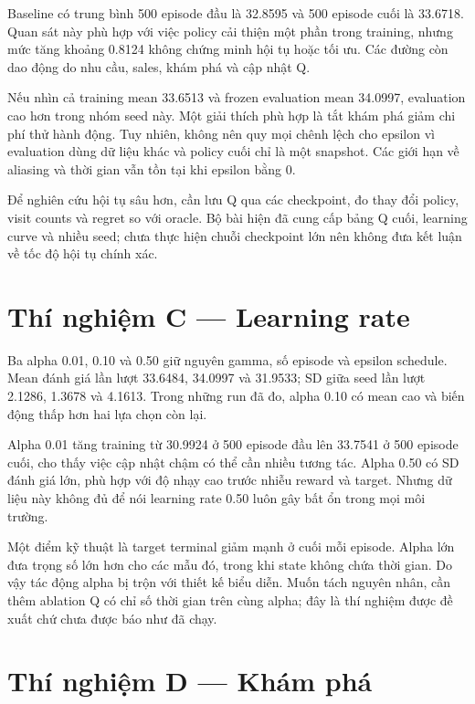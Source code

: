 Baseline có trung bình 500 episode đầu là 32.8595 và 500 episode cuối là
33.6718. Quan sát này phù hợp với việc policy cải thiện một phần trong
training, nhưng mức tăng khoảng 0.8124 không chứng minh hội tụ hoặc tối
ưu. Các đường còn dao động do nhu cầu, sales, khám phá và cập nhật Q.

Nếu nhìn cả training mean 33.6513 và frozen evaluation mean 34.0997,
evaluation cao hơn trong nhóm seed này. Một giải thích phù hợp là tắt
khám phá giảm chi phí thử hành động. Tuy nhiên, không nên quy mọi chênh
lệch cho epsilon vì evaluation dùng dữ liệu khác và policy cuối chỉ là
một snapshot. Các giới hạn về aliasing và thời gian vẫn tồn tại khi
epsilon bằng 0.

Để nghiên cứu hội tụ sâu hơn, cần lưu Q qua các checkpoint, đo thay đổi
policy, visit counts và regret so với oracle. Bộ bài hiện đã cung cấp
bảng Q cuối, learning curve và nhiều seed; chưa thực hiện chuỗi
checkpoint lớn nên không đưa kết luận về tốc độ hội tụ chính xác.

\section{Thí nghiệm C --- Learning
rate}\label{thuxed-nghiux1ec7m-c-learning-rate}

Ba alpha 0.01, 0.10 và 0.50 giữ nguyên gamma, số episode và epsilon
schedule. Mean đánh giá lần lượt 33.6484, 34.0997 và 31.9533; SD giữa
seed lần lượt 2.1286, 1.3678 và 4.1613. Trong những run đã đo, alpha
0.10 có mean cao và biến động thấp hơn hai lựa chọn còn lại.

Alpha 0.01 tăng training từ 30.9924 ở 500 episode đầu lên 33.7541 ở 500
episode cuối, cho thấy việc cập nhật chậm có thể cần nhiều tương tác.
Alpha 0.50 có SD đánh giá lớn, phù hợp với độ nhạy cao trước nhiễu
reward và target. Nhưng dữ liệu này không đủ để nói learning rate 0.50
luôn gây bất ổn trong mọi môi trường.

Một điểm kỹ thuật là target terminal giảm mạnh ở cuối mỗi episode. Alpha
lớn đưa trọng số lớn hơn cho các mẫu đó, trong khi state không chứa thời
gian. Do vậy tác động alpha bị trộn với thiết kế biểu diễn. Muốn tách
nguyên nhân, cần thêm ablation Q có chỉ số thời gian trên cùng alpha;
đây là thí nghiệm được đề xuất chứ chưa được báo như đã chạy.

\section{Thí nghiệm D --- Khám
phá}\label{thuxed-nghiux1ec7m-d-khuxe1m-phuxe1}

